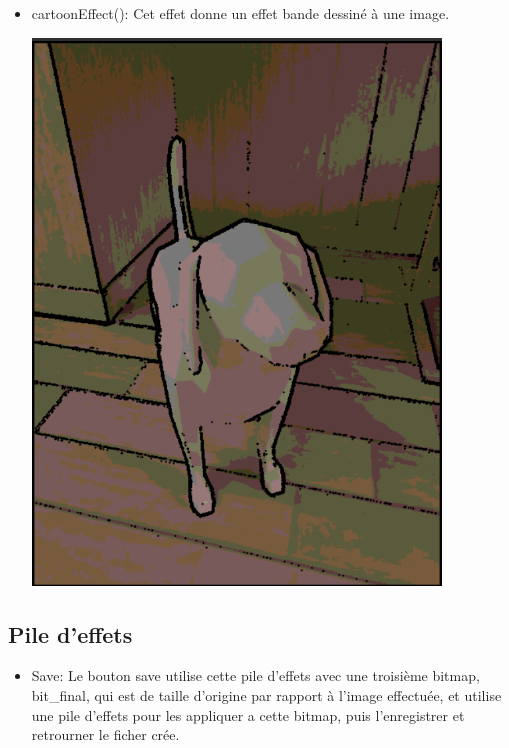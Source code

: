\documentclass[12pt]{article}
\begin{document}
\begin{itemize}
\begin{itemize}
    \item cartoonEffect():
    Cet effet donne un effet bande dessiné à une image.

    \includegraphics{dog_cartoon}

\end{itemize}

\subsection{Pile d'effets}

\begin{itemize}
Nous avons ajouté la possiblité de défaire des modifcations en enregistrant les effets successifs afin de pouvoir récréer un état anterieur de l'image.

Ces états sont empilés au fur et a mesure de leur utilisation dans l'application, et sont dépilé après l'utilisation d'un des effets suivants.\\

\item Save:
Le bouton save utilise cette pile d'effets avec une troisième bitmap, bit_final, qui est de taille d’origine par rapport à l’image effectuée, et utilise une pile d’effets pour les appliquer a cette bitmap, puis l’enregistrer et retrourner le ficher crée.
\\


\end{itemize}
\end{itemize}
\end{document}
